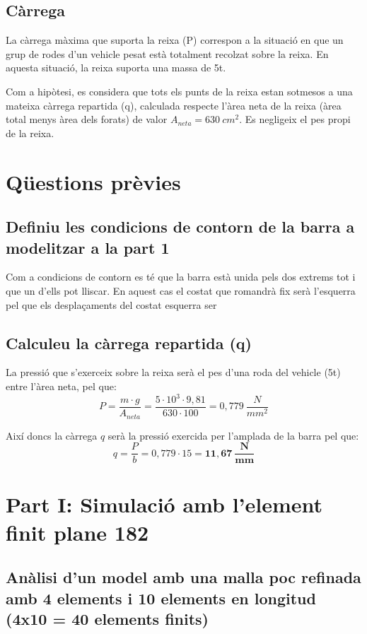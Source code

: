 \documentclass[a4paper]{article}
\begin{document}
\subsection{Càrrega}
La càrrega màxima que suporta la reixa (P) correspon a la situació en que un grup de rodes d'un vehicle pesat està totalment recolzat sobre la reixa. En aquesta situació, la reixa suporta una massa de 5t.

Com a hipòtesi, es considera que tots els punts de la reixa estan sotmesos a una mateixa càrrega repartida (q), calculada respecte l'àrea neta de la reixa (àrea total menys àrea dels forats) de valor $A_{neta} = 630 \ cm^2$. Es negligeix el pes propi de la reixa.

\section{Qüestions prèvies}
\subsection{Definiu les condicions de contorn de la barra a modelitzar a la part 1}

Com a condicions de contorn es té que la barra està unida pels dos extrems tot i que un d'ells pot lliscar. En aquest cas el costat que romandrà fix serà l'esquerra pel que els desplaçaments del costat esquerra ser

\subsection{Calculeu la càrrega repartida (q)}

La pressió que s'exerceix sobre la reixa serà el pes d'una roda del vehicle (5t) entre l'àrea neta, pel que:
$$
P = \frac{m \cdot g}{A_{neta}} = \frac{5\cdot10^3 \cdot 9,81}{630 \cdot 100} = 0,779\ \frac{N}{mm^2}
$$

Així doncs la càrrega $q$ serà la pressió exercida per l'amplada de la barra pel que:
$$
q = \frac{P}{b} = 0,779 \cdot 15 = \boldsymbol{11,67 \ \frac{N}{mm}} 
$$

\pagebreak
\section{Part I: Simulació amb l'element finit plane 182}
\subsection{Anàlisi d'un model amb una malla poc refinada amb 4 elements i 10 elements en longitud (4x10 = 40 elements finits)}
\end{document}
